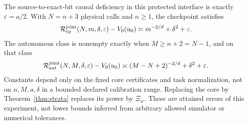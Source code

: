 \begin{theorem}\label{thm:joint}
The source-to-exact-bit causal deficiency in this protected interface is exactly $\varepsilon=a/2$. With $N=n+3$ physical calls and $n\ge1$, the checkpoint satisfies
\[
 \mathcal R^{\rm joint}_{\rm cp}(N,m,\delta,\varepsilon)-V_0(u_0)
       \asymp m^{-2/d}+\delta^2+\varepsilon.
\]
The autonomous class is nonempty exactly when $M\ge n+2=N-1$, and on that class
\begin{equation}\label{eq:joint}
 \mathcal R^{\rm joint}_{\rm aut}(N,M,\delta,\varepsilon)-V_0(u_0)
       \asymp (M-N+2)^{-2/d}+\delta^2+\varepsilon.
\end{equation}
Constants depend only on the fixed core certificates and task normalization, not on $n,M,a,\delta$ in a bounded declared calibration range. Replacing the core by Theorem~\ref{thm:strata} replaces its power by $\Xi_w$. These are attained errors of this experiment, not lower bounds inferred from arbitrary allowed simulator or numerical tolerances.
\end{theorem}
